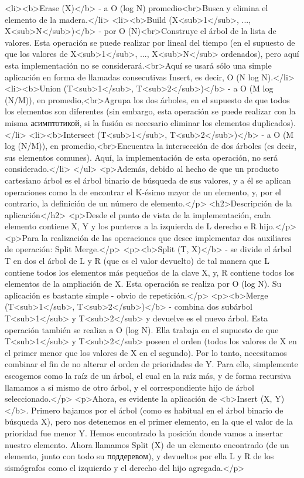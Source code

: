 <li><b>Erase (X)</b> - a O (log N) promedio<br>Busca y elimina el elemento de la madera.</li>
<li><b>Build (X<sub>1</sub>, ..., X<sub>N</sub>)</b> - por O (N)<br>Construye el árbol de la lista de valores. Esta operación se puede realizar por lineal del tiempo (en el supuesto de que los valores de X<sub>1</sub>, ..., X<sub>N</sub> ordenados), pero aquí esta implementación no se considerará.<br>Aquí se usará sólo una simple aplicación en forma de llamadas consecutivas Insert, es decir, O (N log N).</li>
<li><b>Union (T<sub>1</sub>, T<sub>2</sub>)</b> - a O (M log (N/M)), en promedio,<br>Agrupa los dos árboles, en el supuesto de que todos los elementos son diferentes (sin embargo, esta operación se puede realizar con la misma асимптотикой, si la fusión es necesario eliminar los elementos duplicados).</li>
<li><b>Intersect (T<sub>1</sub>, T<sub>2</sub>)</b> - a O (M log (N/M)), en promedio,<br>Encuentra la intersección de dos árboles (es decir, sus elementos comunes). Aquí, la implementación de esta operación, no será considerado.</li>
</ul>
<p>Además, debido al hecho de que un producto cartesiano árbol es el árbol binario de búsqueda de sus valores, y a él se aplican operaciones como la de encontrar el K-ésimo mayor de un elemento, y, por el contrario, la definición de un número de elemento.</p>
<h2>Descripción de la aplicación</h2>
<p>Desde el punto de vista de la implementación, cada elemento contiene X, Y y los punteros a la izquierda de L derecho e R hijo.</p>
<p>Para la realización de las operaciones que desee implementar dos auxiliares de operación: Split Merge.</p>
<p><b>Split (T, X)</b> - se divide el árbol T en dos el árbol de L y R (que es el valor devuelto) de tal manera que L contiene todos los elementos más pequeños de la clave X, y, R contiene todos los elementos de la ampliación de X. Esta operación se realiza por O (log N). Su aplicación es bastante simple - obvio de repetición.</p>
<p><b>Merge (T<sub>1</sub>, T<sub>2</sub>)</b> - combina dos subárbol T<sub>1</sub> y T<sub>2</sub> y devuelve es el nuevo árbol. Esta operación también se realiza a O (log N). Ella trabaja en el supuesto de que T<sub>1</sub> y T<sub>2</sub> poseen el orden (todos los valores de X en el primer menor que los valores de X en el segundo). Por lo tanto, necesitamos combinar el fin de no alterar el orden de prioridades de Y. Para ello, simplemente escogemos como la raíz de un árbol, el cual en la raíz más, y de forma recursiva llamamos a sí mismo de otro árbol, y el correspondiente hijo de árbol seleccionado.</p>
<p>Ahora, es evidente la aplicación de <b>Insert (X, Y)</b>. Primero bajamos por el árbol (como es habitual en el árbol binario de búsqueda X), pero nos detenemos en el primer elemento, en la que el valor de la prioridad fue menor Y. Hemos encontrado la posición donde vamos a insertar nuestro elemento. Ahora llamamos Split (X) de un elemento encontrado (de un elemento, junto con todo su поддеревом), y devueltos por ella L y R de los sismógrafos como el izquierdo y el derecho del hijo agregada.</p>
